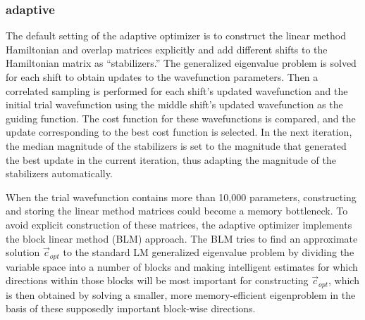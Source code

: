 \subsubsection{adaptive}

The default setting of the adaptive optimizer is to construct the linear method Hamiltonian and overlap matrices explicitly and add different shifts to the Hamiltonian matrix 
as ``stabilizers.''
The generalized eigenvalue problem is solved for each shift to obtain updates to the wavefunction parameters.
Then a correlated sampling is performed for each shift's updated wavefunction and the initial trial wavefunction
using the middle shift's updated wavefunction as the guiding function.
The cost function for these wavefunctions is compared, and the update corresponding to the best cost function is selected.
In the next iteration, the median magnitude of the stabilizers is set to the magnitude that generated the best update in the current iteration, thus adapting the magnitude of
the stabilizers automatically.

When the trial wavefunction contains more than 10,000 parameters, constructing and storing the linear method matrices could become a memory bottleneck. 
To avoid explicit construction of these matrices, the adaptive optimizer implements the block linear method (BLM) approach. \cite{Zhao:2017:blocked_lm}
The BLM tries to find an approximate 
solution\:  $\vec{c}_{opt}$ to the standard LM generalized eigenvalue problem by dividing the variable space into a number of blocks
and making intelligent estimates for which directions within those blocks will be most important for constructing\:   $\vec{c}_{opt}$, 
which is then obtained by solving a smaller, more memory-efficient 
eigenproblem in the basis of these supposedly important block-wise directions. 

